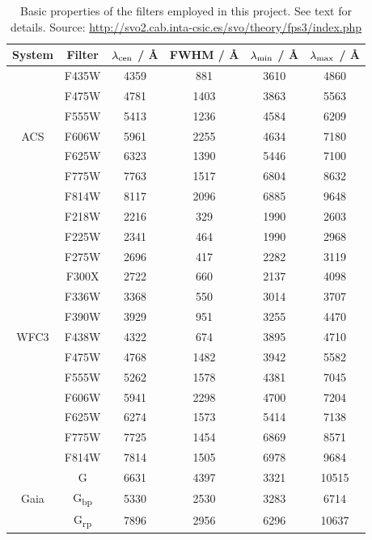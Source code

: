 \documentclass[12pt, a4paper]{report}
\begin{document}
\begin{table}
\begin{center}
\begin{tabular}{cccccc}
\hline
System & Filter & $\lambda_{\textnormal{cen}}$ / \AA & FWHM / \AA & $\lambda_{\textnormal{min}}$ / \AA & $\lambda_{\textnormal{max}}$ / \AA \\
\hline
& F435W & 4359 & 881 & 3610 & 4860 \\ %
& F475W & 4781 & 1403 & 3863 & 5563 \\ %
& F555W & 5413 & 1236 & 4584 & 6209 \\ %
ACS & F606W & 5961 & 2255 & 4634 & 7180 \\ %
& F625W & 6323 & 1390 & 5446 & 7100 \\ %
& F775W & 7763 & 1517 & 6804 & 8632 \\ %
& F814W & 8117 & 2096 & 6885 & 9648 \\ %
\hline
& F218W & 2216 & 329 & 1990 & 2603 \\ %
& F225W & 2341 & 464 & 1990 & 2968 \\ %
& F275W & 2696 & 417 & 2282 & 3119 \\ %
& F300X & 2722 & 660 & 2137 & 4098 \\ %
& F336W & 3368 & 550 & 3014 & 3707 \\ %
& F390W & 3929 & 951 & 3255 & 4470 \\ %
WFC3 & F438W & 4322 & 674 & 3895 & 4710 \\ %
& F475W & 4768 & 1482 & 3942 & 5582 \\ %
& F555W & 5262 & 1578 & 4381 & 7045 \\ %
& F606W & 5941 & 2298 & 4700 & 7204 \\ %
& F625W & 6274 & 1573 & 5414 & 7138 \\ %
& F775W & 7725 & 1454 & 6869 & 8571 \\ %
& F814W & 7814 & 1505 & 6978 & 9684 \\ %
\hline
& G & 6631 & 4397 & 3321 & 10515 \\ %
Gaia & G\textsubscript{bp} & 5330 & 2530 & 3283 & 6714 \\ %
& G\textsubscript{rp} & 7896 & 2956 & 6296 & 10637 \\ %
\hline

\end{tabular}
\caption{Basic properties of the filters employed in this project. See text for details. Source: \protect\url{http://svo2.cab.inta-csic.es/svo/theory/fps3/index.php}}
\label{filter_basics}
\end{center}
\end{table}
\end{document}
